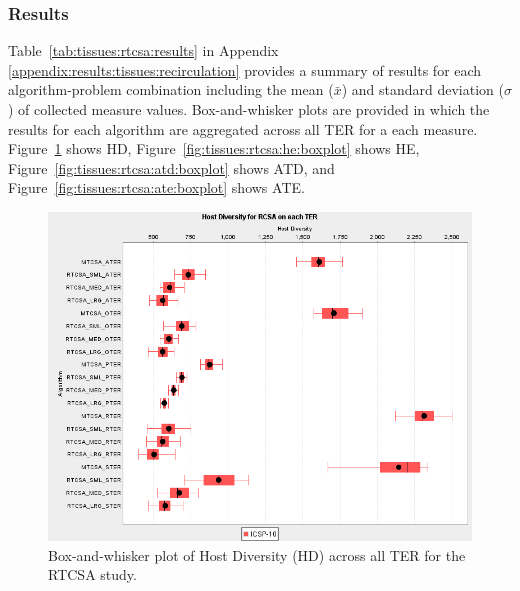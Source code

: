 %
%
\subsubsection{Results}
Table~\ref{tab:tissues:rtcsa:results} in Appendix \ref{appendix:results:tissues:recirculation} provides a summary of results for each algorithm-problem combination including the mean ($\bar{x}$) and standard deviation ($\sigma$) of collected measure values.  Box-and-whisker plots are provided in which the results for each algorithm are aggregated across all TER for a each measure. Figure~\ref{fig:tissues:rtcsa:hd:boxplot} shows HD, Figure~\ref{fig:tissues:rtcsa:he:boxplot} shows HE, Figure~\ref{fig:tissues:rtcsa:atd:boxplot} shows ATD, and Figure~\ref{fig:tissues:rtcsa:ate:boxplot} shows ATE.

\begin{figure}[htp]
	\centering
		\includegraphics[scale=0.65]{Tissues/RTCSA-HD}
	\caption{Box-and-whisker plot of Host Diversity (HD) across all TER for the RTCSA study.}
	\label{fig:tissues:rtcsa:hd:boxplot}
\end{figure}

